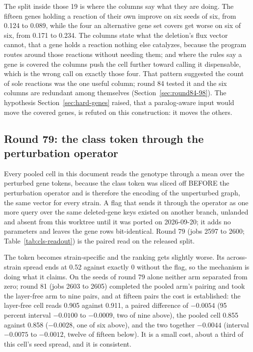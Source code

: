 The split inside those 19 is where the columns say what they are doing. The fifteen genes
holding a reaction of their own improve on six seeds of six, from 0.124 to 0.089, while
the four an alternative gene set covers get worse on six of six, from 0.171 to 0.234. The
columns state what the deletion's flux vector cannot, that a gene holds a reaction nothing
else catalyzes, because the program routes around those reactions without needing them;
and where the rules say a gene is covered the columns push the cell further toward calling
it dispensable, which is the wrong call on exactly those four. That pattern suggested the
count of sole reactions was the one useful column; round 84 tested it and the six columns
are redundant among themselves (Section~\ref{sec:round84-98}). The
hypothesis Section~\ref{sec:hard-genes} raised, that a paralog-aware input would move the
covered genes, is refuted on this construction: it moves the others.



\subsection{Round 79: the class token through the perturbation operator}
\label{sec:round79}

Every pooled cell in this document reads the genotype through a mean over the perturbed
gene tokens, because the class token was sliced off BEFORE the perturbation operator and
is therefore the encoding of the unperturbed graph, the same vector for every strain. A
flag that sends it through the operator as one more query over the same deleted-gene keys
existed on another branch, unlanded and absent from this worktree until it was ported on
2026-09-20; it adds no parameters and leaves the gene rows bit-identical. Round 79 (jobs
2597 to 2600; Table~\ref{tab:cls-readout}) is the paired read on the released split.

The token becomes strain-specific and the ranking gets slightly worse. Its across-strain
spread ends at 0.52 against exactly 0 without the flag, so the mechanism is doing what it
claims. On the seeds of round 79 alone neither arm separated from zero; round 81 (jobs
2603 to 2605) completed the pooled arm's pairing and took the layer-free arm to nine
pairs, and at fifteen pairs the cost is established: the layer-free cell reads 0.905
against 0.911, a paired difference of $-0.0054$ (95 percent interval $-0.0100$ to
$-0.0009$, two of nine above), the pooled cell 0.855 against 0.858 ($-0.0028$, one of
six above), and the two together $-0.0044$ (interval $-0.0075$ to $-0.0012$, twelve of
fifteen below). It is a small cost, about a third of this cell's seed spread, and it is
consistent.

